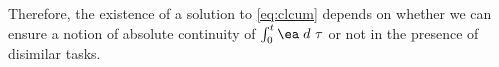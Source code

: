 Therefore, the existence of a solution to \eqref{eq:clcum} depends on whether we can ensure a notion of absolute continuity of $\int_0^t \ea \;  d~\tau$ or not in the presence of disimilar tasks.

